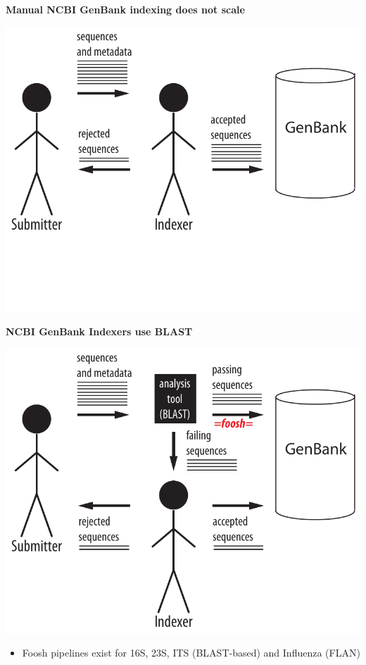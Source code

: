 \documentclass[landscape]{slides}
\begin{document}
\begin{slide}
\begin{center}
\textbf{Manual NCBI GenBank indexing does not scale}

\includegraphics[width=7in]{figs/submission-schematic-1}

\vfill
\end{center}
\end{slide}
\begin{slide}
\begin{center}
\textbf{NCBI GenBank Indexers use BLAST}

\includegraphics[width=7in]{figs/submission-schematic-2}

\small
\begin{itemize}
\item Foosh pipelines exist for 16S, 23S, ITS (BLAST-based) and
    Influenza (FLAN)
\end{itemize}

\vfill
\end{center}
\end{slide}
\end{document}
